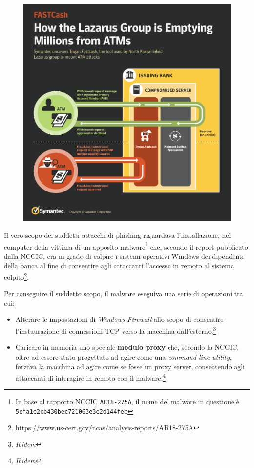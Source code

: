 \documentclass[10pt,a4paper, titlepage]{report}
\begin{document}
\begin{figure}[h!]
    \centering
    \includegraphics[width=\textwidth]{./FASTCash.png} 
\end{figure}

Il vero scopo dei suddetti attacchi di phishing riguardava l'installazione, nel computer della vittima di un apposito malware\footnote{In base al rapporto NCCIC \texttt{AR18-275A}, il nome del malware in questione è \texttt{5cfa1c2cb430bec721063e3e2d144feb}} che, secondo il report pubblicato dalla NCCIC, era in grado di colpire i sistemi operativi Windows dei dipendenti della banca al fine di consentire agli attaccanti l'accesso in remoto al sistema colpito\footnote{\url{https://www.us-cert.gov/ncas/analysis-reports/AR18-275A}}.

Per conseguire il suddetto scopo, il malware eseguiva una serie di operazioni tra cui:

\begin{itemize}
\item Alterare le impostazioni di \textit{Windows Firewall} allo scopo di consentire l'instaurazione di connessioni TCP verso la macchina dall'esterno.\footnote{\textit{Ibidem}}
\item Caricare in memoria uno speciale \textbf{modulo proxy} che, secondo la NCCIC, oltre ad essere stato progettato ad agire come una \textit{command-line utility}, forzava la macchina ad agire come se fosse un proxy server, consentendo agli attaccanti di interagire in remoto con il malware.\footnote{\textit{Ibidem}}
\end{itemize}
\end{document}
